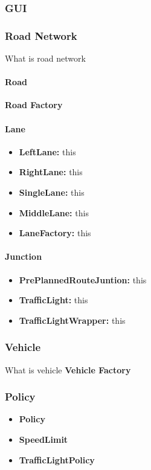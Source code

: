 \documentclass[11pt]{article}
\begin{document}
\begin{itemize}
\subsubsection{GUI}

\subsubsection{Road Network}
What is road network
    \paragraph{Road}
    \textbf{Road Factory}\\
    \paragraph{Lane}
    \begin{itemize}[noitemsep]
    \item \textbf{LeftLane:} this  
    \item \textbf{RightLane:} this
    \item \textbf{SingleLane:} this
    \item \textbf{MiddleLane:} this  
    \item \textbf{LaneFactory:} this
    \end{itemize}
    \paragraph{Junction}
    \begin{itemize}[noitemsep]
    \item \textbf{PrePlannedRouteJuntion:} this  
    \item \textbf{TrafficLight:} this
    \item \textbf{TrafficLightWrapper:} this
    \end{itemize}
    
\subsubsection{Vehicle}
What is vehicle
\textbf{Vehicle Factory}\\


\subsubsection{Policy}        
\begin{itemize}[noitemsep]
\item \textbf{Policy} 
\item \textbf{SpeedLimit} 
\item \textbf{TrafficLightPolicy}
\end{itemize}


\end{itemize}
\end{document}
